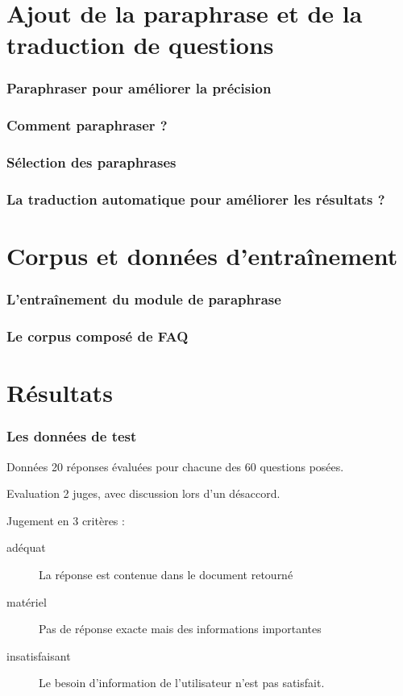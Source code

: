 \documentclass[10pt]{beamer}
\begin{document}
\section{Ajout de la paraphrase et de la traduction de questions}
\label{sec:paratrans}

\begin{frame}
  \frametitle{Paraphraser pour améliorer la précision}
\end{frame}

\begin{frame}
  \frametitle{Comment paraphraser ?}
\end{frame}

\begin{frame}
  \frametitle{Sélection des paraphrases}
\end{frame}

\begin{frame}
  \frametitle{La traduction automatique pour améliorer les résultats
    ?}
\end{frame}

\section{Corpus et données d'entraînement}
\label{sec:corpus}

\begin{frame}
  \frametitle{L'entraînement du module de paraphrase}
\end{frame}

\begin{frame}
  \frametitle{Le corpus composé de FAQ}
  
\end{frame}


\section{Résultats}
\label{sec:results}


\begin{frame}
  \frametitle{Les données de test}
  \begin{block}{Données}
    20 réponses évaluées pour chacune des 60 questions posées.
  \end{block}

  \pause

  \begin{block}{Evaluation}
    2 juges, avec discussion lors d'un désaccord.
    
    Jugement en 3 critères :
    \begin{description}
    \item[adéquat] La réponse est contenue dans le document retourné
    \item[matériel] Pas de réponse exacte mais des informations importantes
    \item[insatisfaisant] Le besoin d'information de l'utilisateur
      n'est pas satisfait.
    \end{description}
  \end{block}
\end{frame}
\end{document}
